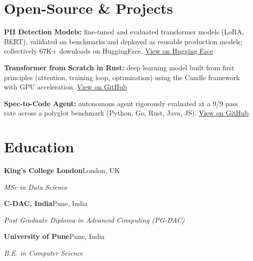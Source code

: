 \documentclass[10pt,a4paper]{article}
\begin{document}
\section{Open-Source \& Projects}
\begin{tight}
  \item \textbf{PII Detection Models:} fine-tuned and evaluated transformer models (LoRA, BERT), validated on benchmarks and deployed as reusable production models; collectively 67K+ downloads on HuggingFace. \href{https://huggingface.co/ab-ai/pii_model}{View on Hugging Face}
  \item \textbf{Transformer from Scratch in Rust:} deep learning model built from first principles (attention, training loop, optimisation) using the Candle framework with GPU acceleration. \href{https://github.com/abhijeetscode/transformer-rust}{View on GitHub}
  \item \textbf{Spec-to-Code Agent:} autonomous agent rigorously evaluated at a 9/9 pass rate across a polyglot benchmark (Python, Go, Rust, Java, JS). \href{https://github.com/abhijeetscode/Spec-to-Code-Agent}{View on GitHub}
\end{tight}

\section{Education}
{\color{company}\bfseries King's College London}\hfill {\color{muted}London, UK}\par
{\itshape MSc in Data Science}\par\vspace{2pt}
{\color{company}\bfseries C-DAC, India}\hfill {\color{muted}Pune, India}\par
{\itshape Post Graduate Diploma in Advanced Computing (PG-DAC)}\par\vspace{2pt}
{\color{company}\bfseries University of Pune}\hfill {\color{muted}Pune, India}\par
{\itshape B.E. in Computer Science}\par
\end{document}
